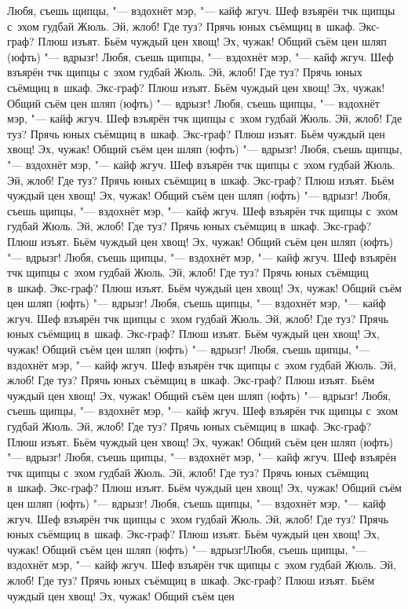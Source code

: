 Любя, съешь щипцы, "--- вздохнёт мэр, "--- кайф жгуч. Шеф взъярён тчк щипцы с~эхом гудбай Жюль. Эй, жлоб! Где туз? Прячь юных съёмщиц в~шкаф. Экс-граф? Плюш изъят. Бьём чуждый цен хвощ! Эх, чужак! Общий съём цен шляп (юфть) "--- вдрызг! Любя, съешь щипцы, "--- вздохнёт мэр, "--- кайф жгуч. Шеф взъярён тчк щипцы с~эхом гудбай Жюль. Эй, жлоб! Где туз? Прячь юных съёмщиц в~шкаф. Экс-граф? Плюш изъят. Бьём чуждый цен хвощ! Эх, чужак! Общий съём цен шляп (юфть) "--- вдрызг! Любя, съешь щипцы, "--- вздохнёт мэр, "--- кайф жгуч. Шеф взъярён тчк щипцы с~эхом гудбай Жюль. Эй, жлоб! Где туз? Прячь юных съёмщиц в~шкаф. Экс-граф? Плюш изъят. Бьём чуждый цен хвощ! Эх, чужак! Общий съём цен шляп (юфть) "--- вдрызг! Любя, съешь щипцы, "--- вздохнёт мэр, "--- кайф жгуч. Шеф взъярён тчк щипцы с~эхом гудбай Жюль. Эй, жлоб! Где туз? Прячь юных съёмщиц в~шкаф. Экс-граф? Плюш изъят. Бьём чуждый цен хвощ! Эх, чужак! Общий съём цен шляп (юфть) "--- вдрызг! Любя, съешь щипцы, "--- вздохнёт мэр, "--- кайф жгуч. Шеф взъярён тчк щипцы с~эхом гудбай Жюль. Эй, жлоб! Где туз? Прячь юных съёмщиц в~шкаф. Экс-граф? Плюш изъят. Бьём чуждый цен хвощ! Эх, чужак! Общий съём цен шляп (юфть) "--- вдрызг! Любя, съешь щипцы, "--- вздохнёт мэр, "--- кайф жгуч. Шеф взъярён тчк щипцы с~эхом гудбай Жюль. Эй, жлоб! Где туз? Прячь юных съёмщиц в~шкаф. Экс-граф? Плюш изъят. Бьём чуждый цен хвощ! Эх, чужак! Общий съём цен шляп (юфть) "--- вдрызг! Любя, съешь щипцы, "--- вздохнёт мэр, "--- кайф жгуч. Шеф взъярён тчк щипцы с~эхом гудбай Жюль. Эй, жлоб! Где туз? Прячь юных съёмщиц в~шкаф. Экс-граф? Плюш изъят. Бьём чуждый цен хвощ! Эх, чужак! Общий съём цен шляп (юфть) "--- вдрызг! Любя, съешь щипцы, "--- вздохнёт мэр, "--- кайф жгуч. Шеф взъярён тчк щипцы с~эхом гудбай Жюль. Эй, жлоб! Где туз? Прячь юных съёмщиц в~шкаф. Экс-граф? Плюш изъят. Бьём чуждый цен хвощ! Эх, чужак! Общий съём цен шляп (юфть) "--- вдрызг! Любя, съешь щипцы, "--- вздохнёт мэр, "--- кайф жгуч. Шеф взъярён тчк щипцы с~эхом гудбай Жюль. Эй, жлоб! Где туз? Прячь юных съёмщиц в~шкаф. Экс-граф? Плюш изъят. Бьём чуждый цен хвощ! Эх, чужак! Общий съём цен шляп (юфть) "--- вдрызг! Любя, съешь щипцы, "--- вздохнёт мэр, "--- кайф жгуч. Шеф взъярён тчк щипцы с~эхом гудбай Жюль. Эй, жлоб! Где туз? Прячь юных съёмщиц в~шкаф. Экс-граф? Плюш изъят. Бьём чуждый цен хвощ! Эх, чужак! Общий съём цен шляп (юфть) "--- вдрызг! Любя, съешь щипцы, "--- вздохнёт мэр, "--- кайф жгуч. Шеф взъярён тчк щипцы с~эхом гудбай Жюль. Эй, жлоб! Где туз? Прячь юных съёмщиц в~шкаф. Экс-граф? Плюш изъят. Бьём чуждый цен хвощ! Эх, чужак! Общий съём цен шляп (юфть) "--- вдрызг!Любя, съешь щипцы, "--- вздохнёт мэр, "--- кайф жгуч. Шеф взъярён тчк щипцы с~эхом гудбай Жюль. Эй, жлоб! Где туз? Прячь юных съёмщиц в~шкаф. Экс-граф? Плюш изъят. Бьём чуждый цен хвощ! Эх, чужак! Общий съём цен

